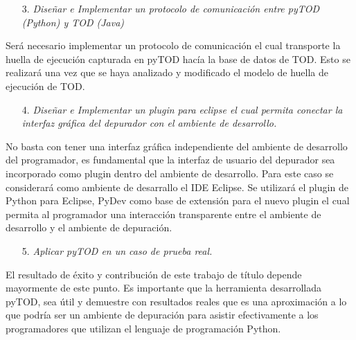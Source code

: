 \documentclass[12pt,legalpaper]{report}
\begin{document}
\begin{itemize}
\item[3.] \textit{Diseñar e Implementar un protocolo de comunicación entre pyTOD (Python) y TOD (Java)}
\end{itemize}

Será necesario implementar un protocolo de comunicación el cual transporte la huella de ejecución capturada en pyTOD hacía la base de datos de TOD.  Esto se realizará una vez que se haya analizado y modificado el modelo de huella de ejecución de TOD.



\begin{itemize}
\item[4.] \textit{Diseñar e Implementar un plugin para eclipse el cual permita conectar la interfaz gráfica del depurador con el ambiente de desarrollo.}
\end{itemize}

No basta con tener una interfaz gráfica independiente del ambiente de desarrollo del programador, es fundamental que la interfaz de usuario del depurador sea incorporado como plugin dentro del ambiente de desarrollo.  Para este caso se considerará como ambiente de desarrallo el IDE Eclipse\footnotemark[2].  Se utilizará el plugin de Python para Eclipse, PyDev como base de extensión para el nuevo plugin el cual permita al programador una interacción transparente entre el ambiente de desarrollo y el ambiente de depuración.


\begin{itemize}
\item[5.] \textit{Aplicar pyTOD en un caso de prueba real.}
\end{itemize}

El resultado de éxito y contribución de este trabajo de título depende mayormente de este punto.  Es importante que la herramienta desarrollada pyTOD, sea útil y demuestre con resultados reales que es una aproximación a lo que podría ser un ambiente de depuración para asistir efectivamente a los programadores que utilizan el lenguaje de programación Python.
\end{document}

